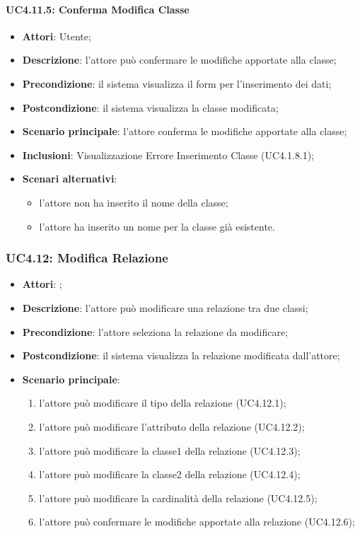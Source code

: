 \paragraph{UC4.11.5: Conferma Modifica Classe}
\label{UC4.11.5}
\begin{itemize}
\item \textbf{Attori}: Utente;
\item \textbf{Descrizione}: l'attore può confermare le modifiche apportate alla classe;
\item \textbf{Precondizione}: il sistema visualizza il form per l'inserimento dei dati;	
\item \textbf{Postcondizione}: il sistema visualizza la classe modificata;	
\item \textbf{Scenario principale}:
l'attore conferma le modifiche apportate alla classe;	
\item \textbf{Inclusioni}:
Visualizzazione Errore Inserimento Classe (UC4.1.8.1);
\item \textbf{Scenari alternativi}:
\begin{itemize}
\item l'attore non ha inserito il nome della classe;
\item l'attore ha inserito un nome per la classe già esistente.
\end{itemize}
\end{itemize}

\subsubsection{UC4.12: Modifica Relazione}
\label{UC4.12}
\begin{itemize}
\item \textbf{Attori}: ;
\item \textbf{Descrizione}: l'attore può modificare una relazione tra due classi;	
\item \textbf{Precondizione}: l'attore seleziona la relazione da modificare;	
\item \textbf{Postcondizione}: il sistema visualizza la relazione modificata dall'attore;	
\item \textbf{Scenario principale}:
\begin{enumerate}
\item l'attore può modificare il tipo della relazione (UC4.12.1);
\item l'attore può modificare l'attributo della relazione (UC4.12.2);
\item l'attore può modificare la classe1 della relazione (UC4.12.3);
\item l'attore può modificare la classe2 della relazione (UC4.12.4);
\item l'attore può modificare la cardinalità della relazione (UC4.12.5); 
\item l'attore può confermare le modifiche apportate alla relazione (UC4.12.6);

\end{enumerate}	
\end{itemize}

